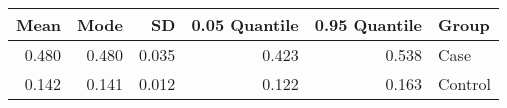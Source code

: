 \begin{table}[ht]
\centering
\begin{tabular}{rrrrrl}
  \hline
Mean & Mode & SD & 0.05 Quantile & 0.95 Quantile & Group \\ 
  \hline
0.480 & 0.480 & 0.035 & 0.423 & 0.538 & Case \\ 
  0.142 & 0.141 & 0.012 & 0.122 & 0.163 & Control \\ 
   \hline
\end{tabular}
\end{table}
